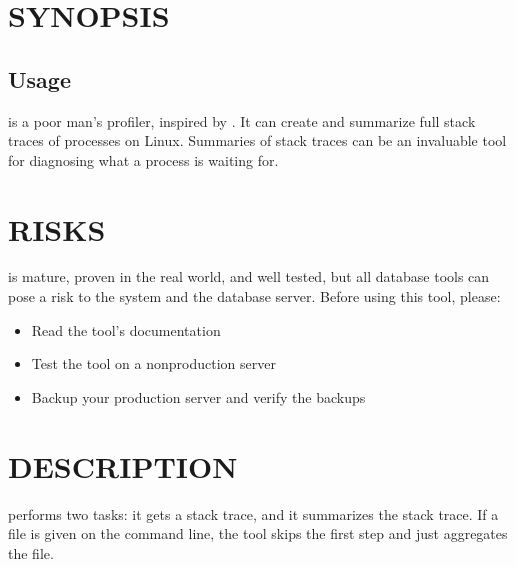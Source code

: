 \documentclass[letterpaper,10pt,english]{sphinxmanual}
\begin{document}
\section{SYNOPSIS}
\label{\detokenize{mariadb-stacktrace:synopsis}}

\subsection{Usage}
\label{\detokenize{mariadb-stacktrace:usage}}
\begin{sphinxVerbatim}[commandchars=\\\{\}]
 \PYG{p}{[}\PYG{p}{]} \PYG{p}{[}\PYG{p}{]}
\end{sphinxVerbatim}

\sphinxAtStartPar
{} is a poor man’s profiler, inspired by .
It can create and summarize full stack traces of processes on Linux.
Summaries of stack traces can be an invaluable tool for diagnosing what
a process is waiting for.


\section{RISKS}
\label{\detokenize{mariadb-stacktrace:risks}}
\sphinxAtStartPar
{} is mature, proven in the real world, and well tested,
but all database tools can pose a risk to the system and the database
server.  Before using this tool, please:
\begin{itemize}
\item {} 
\sphinxAtStartPar
Read the tool’s documentation

\item {} 
\sphinxAtStartPar
Test the tool on a non\sphinxhyphen{}production server

\item {} 
\sphinxAtStartPar
Backup your production server and verify the backups

\end{itemize}


\section{DESCRIPTION}
\label{\detokenize{mariadb-stacktrace:description}}
\sphinxAtStartPar
{} performs two tasks: it gets a stack trace, and it summarizes the stack
trace.  If a file is given on the command line, the tool skips the first step
and just aggregates the file.
\end{document}
